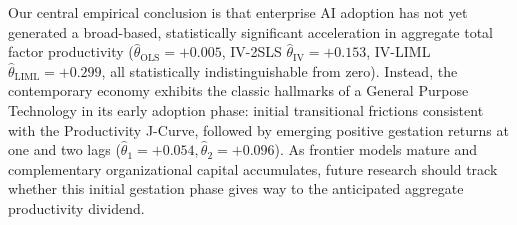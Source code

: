 \documentclass[11pt,a4paper]{article}
\begin{document}
Our central empirical conclusion is that enterprise AI adoption has not yet generated a broad-based, statistically significant acceleration in aggregate total factor productivity ($\hat{\theta}_{\text{OLS}} = +0.005$, IV-2SLS $\hat{\theta}_{\text{IV}} = +0.153$, IV-LIML $\hat{\theta}_{\text{LIML}} = +0.299$, all statistically indistinguishable from zero). Instead, the contemporary economy exhibits the classic hallmarks of a General Purpose Technology in its early adoption phase: initial transitional frictions consistent with the Productivity J-Curve, followed by emerging positive gestation returns at one and two lags ($\hat{\theta}_1 = +0.054, \hat{\theta}_2 = +0.096$). As frontier models mature and complementary organizational capital accumulates, future research should track whether this initial gestation phase gives way to the anticipated aggregate productivity dividend.
\end{document}
